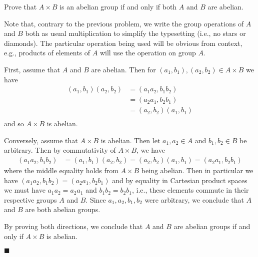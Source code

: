 \documentclass[12pt]{article}
\renewcommand{\qed}{\hfill$\blacksquare$}
\renewenvironment{proof}{\begin{addmargin}[1em]{0em}\begin{newproof}}{\end{newproof}\end{addmargin}\qed}
\newenvironment{problem}[2][Exercise]{\begin{trivlist}
\item[\hskip \labelsep {\bfseries #1}\hskip \labelsep {\bfseries #2.}]}{\end{trivlist}}
\begin{document}
\begin{problem}{1.1.29}
Prove that $A\times B$ is an abelian group if and only if both $A$ and $B$ are abelian.
\end{problem}
Note that, contrary to the previous problem, we write the group operations of $A$ and $B$ both as usual multiplication to simplify the typesetting (i.e., no stars or diamonds). The particular operation being used will be obvious from context, e.g., products of elements of $A$ will use the operation on group $A$. \\
\begin{proof}
First, assume that $A$ and $B$ are abelian. Then for $\left(a_1,b_1\right),\left(a_2,b_2\right)\in A\times B$ we have
\begin{equation*}
    \begin{split}
        \left(a_1,b_1\right)\left(a_2,b_2\right) & = \left(a_1a_2, b_1b_2\right) \\
        & = \left(a_2a_1,b_2b_1\right) \\
        & = \left(a_2,b_2\right)\left(a_1,b_1\right) \\
    \end{split}
\end{equation*}
and so $A\times B$ is abelian.

Conversely, assume that $A\times B$ is abelian. Then let $a_1,a_2 \in A$ and $b_1, b_2 \in B$ be arbitrary. Then by commutativity of $A\times B$, we have
\begin{equation*}
    \begin{split}
        \left(a_1a_2,b_1b_2\right) & =\left(a_1,b_1\right)\left(a_2,b_2\right) = \left(a_2,b_2\right)\left(a_1,b_1\right) = \left(a_2a_1,b_2b_1\right)
    \end{split}
\end{equation*}
where the middle equality holds from $A\times B$ being abelian. Then in particular we have $\left(a_1a_2,b_1b_2\right)=\left(a_2a_1,b_2b_1\right)$ and by equality in Cartesian product spaces we must have $a_1a_2=a_2a_1$ and $b_1b_2=b_2b_1$, i.e., these elements commute in their respective groups $A$ and $B$. Since $a_1,a_2,b_1,b_2$ were arbitrary, we conclude that $A$ and $B$ are both abelian groups.

By proving both directions, we conclude that $A$ and $B$ are abelian groups if and only if $A\times B$ is abelian.
\end{proof}
\end{document}
